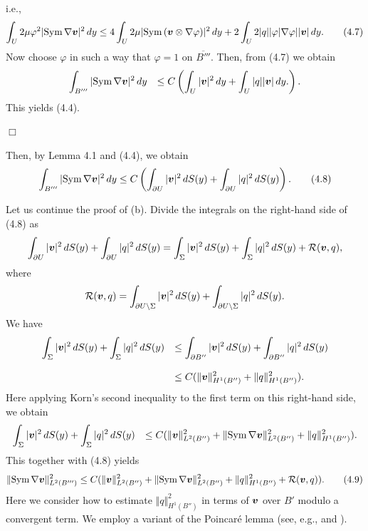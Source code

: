 i.e.,
$$\displaystyle
\int_U2\mu\varphi^2\vert\text{Sym}\,\nabla\mbox{\boldmath $v$}\vert^2\,dy
\le 
4\int_U2\mu\vert\text{Sym}\,(\mbox{\boldmath $v$}\otimes\nabla\varphi)\vert^2\,dy
+2\int_U2\vert q\vert\vert\varphi\vert\nabla\varphi\vert\vert\mbox{\boldmath $v$}\vert\,dy.
\tag {4.7}
$$
Now choose $\varphi$ in such a way that $\varphi=1$ on $\overline{B'''}$.
Then, from (4.7) we obtain
$$\begin{array}{ll}\displaystyle
\int_{B'''}\vert\text{Sym}\,\nabla\mbox{\boldmath $v$}\vert^2\,dy
&
\displaystyle
\le C\left(\int_U\vert\mbox{\boldmath $v$}\vert^2\,dy
+\int_{U}\vert q\vert\vert\mbox{\boldmath $v$}\vert\,dy.
\right).
\end{array}
$$
This yields (4.4).

\noindent
$\Box$

Then, by Lemma 4.1 and (4.4), we obtain
$$\displaystyle
\int_{B'''}\vert\text{Sym}\,\nabla\mbox{\boldmath $v$}\vert^2\,dy
\le C\left(\int_{\partial U}\vert\mbox{\boldmath $v$}\vert^2\,dS(y)
+\int_{\partial U}\vert q\vert^2\,dS(y)\right).
\tag {4.8}
$$






Let us continue the proof of (b).
Divide the integrals on the  right-hand side of  (4.8) as
$$\displaystyle
\int_{\partial U}\vert\mbox{\boldmath $v$}\vert^2\,dS(y)
+\int_{\partial U}\vert q\vert^2\,dS(y)
=\int_{\Sigma}\vert\mbox{\boldmath $v$}\vert^2\,dS(y)
+\int_{\Sigma}\vert q\vert^2\,dS(y)
+{\cal R}(\mbox{\boldmath $v$}, q),
$$
where
$$\displaystyle
{\cal R}(\mbox{\boldmath $v$}, q)
=\int_{\partial U\setminus\Sigma}\vert\mbox{\boldmath $v$}\vert^2\,dS(y)
+\int_{\partial U\setminus\Sigma}\vert q\vert^2\,dS(y).
$$
We have
$$\begin{array}{ll}
\displaystyle
\int_{\Sigma}\vert\mbox{\boldmath $v$}\vert^2\,dS(y)
+\int_{\Sigma}\vert q\vert^2\,dS(y)
&
\displaystyle
\le \int_{\partial B''}\vert\mbox{\boldmath $v$}\vert^2\,dS(y)
+\int_{\partial B''}\vert q\vert^2\,dS(y)
\\
\\
\displaystyle
&
\displaystyle
\le C
(\Vert\mbox{\boldmath $v$}\Vert_{H^1(B'')}^2
+\Vert q\Vert_{H^1(B'')}^2).
\end{array}
$$
Here applying Korn's second inequality to the first term on this right-hand side, we obtain
$$\begin{array}{ll}
\displaystyle
\int_{\Sigma}\vert\mbox{\boldmath $v$}\vert^2\,dS(y)
+\int_{\Sigma}\vert q\vert^2\,dS(y)
&
\displaystyle
\le
C(\Vert \mbox{\boldmath $v$}\Vert_{L^2(B'')}^2+\Vert\text{Sym}\,\nabla\mbox{\boldmath $v$}\Vert_{L^2(B'')}^2
+\Vert q\Vert_{H^1(B'')}^2).
\end{array}
$$
This together with (4.8) yields
$$\displaystyle
\Vert\text{Sym}\,\nabla\mbox{\boldmath $v$}\Vert_{L^2(B''')}^2
\le C(\Vert \mbox{\boldmath $v$}\Vert_{L^2(B'')}^2+\Vert\text{Sym}\,\nabla\mbox{\boldmath $v$}\Vert_{L^2(B'')}^2
+\Vert q\Vert_{H^1(B'')}^2+{\cal R}(\mbox{\boldmath $v$},q)).
\tag {4.9}
$$
Here we consider how to estimate $\Vert q\Vert_{H^1(B'')}^2$ in terms of $\mbox{\boldmath $v$}$ over $B'$
modulo a convergent term.
We employ a variant of the Poincar\'e lemma (see, e.g., \cite{SS} and \cite{Z}).


